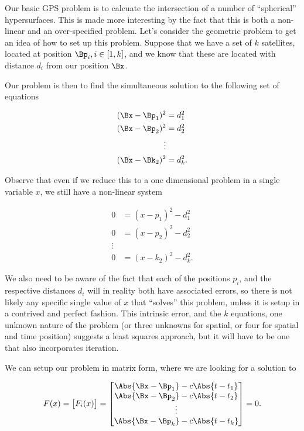 Our basic GPS problem is to calcuate the intersection of a number of ``spherical'' hypersurfaces.  This is made more interesting by the fact that this is both a non-linear and an over-specified problem.  Let's consider the geometric problem to get an idea of how to set up this problem.  Suppose that we have a set of $k$ satellites, located at position $\Bp_i, i \in [1,k]$, and we know that these are located with distance $d_i$ from our position $\Bx$.

Our problem is then to find the simultaneous solution to the following set of equations

\begin{equation}\label{eqn:relativisticElectrodynamicsA1:300}
\begin{aligned}
(\Bx - \Bp_1)^2 &= d_1^2 \\
(\Bx - \Bp_2)^2 &= d_2^2 \\
\vdots \\
(\Bx - \Bk_2)^2 &= d_k^2.
\end{aligned}
\end{equation}

Observe that even if we reduce this to a one dimensional problem in a single variable $x$, we still have a non-linear system

\begin{equation}\label{eqn:relativisticElectrodynamicsA1:300b}
\begin{aligned}
0 &= (x - p_1)^2 - d_1^2 \\
0 &= (x - p_2)^2 - d_2^2 \\
\vdots \\
0 &= (x - k_2)^2 - d_k^2.
\end{aligned}
\end{equation}

We also need to be aware of the fact that each of the positions $p_i$, and the respective distances $d_i$ will in reality both have associated errors, so there is not likely any specific single value of $x$ that ``solves'' this problem, unless it is setup in a contrived and perfect fashion.  This intrinsic error, and the $k$ equations, one unknown nature of the problem (or three unknowns for spatial, or four for spatial and time position) suggests a least squares approach, but it will have to be one that also incorporates iteration.

We can setup our problem in matrix form, where we are looking for a solution to 

\begin{equation}\label{eqn:relativisticElectrodynamicsA1:310}
F(x) = 
\begin{bmatrix}
F_i(x)
\end{bmatrix}
=
\begin{bmatrix}
\Abs{\Bx - \Bp_1} - c \Abs{ t - t_1 } \\
\Abs{\Bx - \Bp_2} - c \Abs{ t - t_2 } \\
\vdots \\
\Abs{\Bx - \Bp_k} - c \Abs{ t - t_k } \\
\end{bmatrix}
= 0.
\end{equation}

